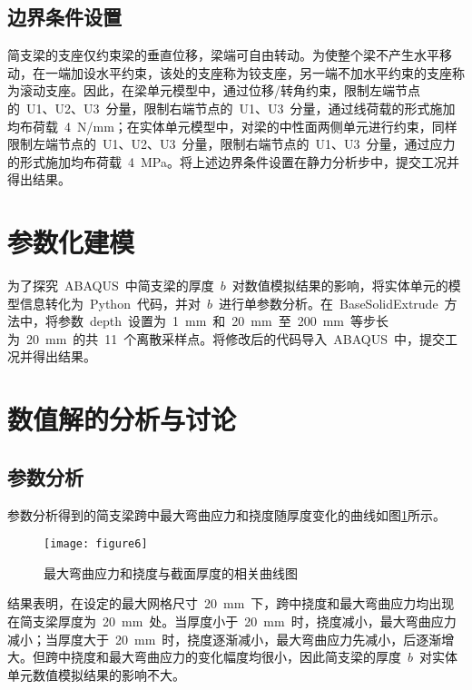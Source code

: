 \subsection{边界条件设置}
简支梁的支座仅约束梁的垂直位移，梁端可自由转动。为使整个梁不产生水平移动，在一端加设水平约束，该处的支座称为铰支座，另一端不加水平约束的支座称为滚动支座。因此，在梁单元模型中，通过位移/转角约束，限制左端节点的~U1、U2、U3~分量，限制右端节点的~U1、U3~分量\cite{gajdosova2018influence}，通过线荷载的形式施加均布荷载~4~N/mm；在实体单元模型中，对梁的中性面两侧单元进行约束\cite{JGXB201402012}，同样限制左端节点的~U1、U2、U3~分量，限制右端节点的~U1、U3~分量，通过应力的形式施加均布荷载~4~MPa。将上述边界条件设置在静力分析步中，提交工况并得出结果。
\section{参数化建模}
为了探究~ABAQUS~中简支梁的厚度~$b$~对数值模拟结果的影响，将实体单元的模型信息转化为~Python~代码，并对~$b$~进行单参数分析\cite{radon2015study,liu2016review}。在~BaseSolidExtrude~方法中，将参数~depth~设置为~1~mm~和~20~mm~至~200~mm~等步长为~20~mm~的共~11~个离散采样点\cite{fu2019recent}。将修改后的代码导入~ABAQUS~中，提交工况并得出结果。
\section{数值解的分析与讨论}
\subsection{参数分析}
参数分析得到的简支梁跨中最大弯曲应力和挠度随厚度变化的曲线如图\ref{fig:para}所示。
\begin{figure}[htbp]
    \centering
	\texttt{[image: figure6]}
    \caption{最大弯曲应力和挠度与截面厚度的相关曲线图}
    \label{fig:para}
\end{figure}
结果表明，在设定的最大网格尺寸~20~mm~下，跨中挠度和最大弯曲应力均出现在简支梁厚度为~20~mm~处。当厚度小于~20~mm~时，挠度减小，最大弯曲应力减小；当厚度大于~20~mm~时，挠度逐渐减小，最大弯曲应力先减小，后逐渐增大。但跨中挠度和最大弯曲应力的变化幅度均很小，因此简支梁的厚度~$b$~对实体单元数值模拟结果的影响不大。


